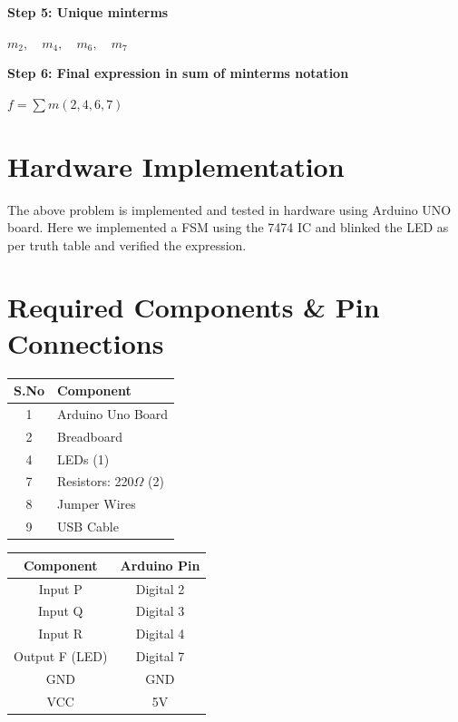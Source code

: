 \documentclass[a4paper,12pt]{article}
\begin{document}
\textbf{Step 5: Unique minterms}

$
m_2, \quad m_4, \quad m_6, \quad m_7
$

\textbf{Step 6: Final expression in sum of minterms notation}

$
f = \sum m(2, 4, 6, 7)
$

\section*{\textbf{Hardware Implementation}}
The above problem is implemented and tested in hardware using Arduino UNO board. Here we implemented a FSM using the 7474 IC and blinked the LED as per truth table and verified the expression.
\section*{Required Components \& Pin Connections}
\begin{center}
\begin{minipage}{0.45\textwidth}
\begin{table}[H]
\centering
\begin{tabular}{|c|l|}
\hline
\textbf{S.No} & \textbf{Component} \\ \hline
1 & Arduino Uno Board \\
2 & Breadboard \\
4 & LEDs (1) \\
7 & Resistors: 220$\Omega$ (2) \\
8 & Jumper Wires \\
9 & USB Cable \\
\hline
\end{tabular}
\end{table}
\end{minipage}
\hspace{0.05\textwidth}
\begin{minipage}{0.45\textwidth}
\begin{table}[H]
\centering
\begin{tabular}{|c|c|}
\hline
\textbf{Component} & \textbf{Arduino Pin} \\ \hline
Input P  & Digital 2 \\
Input Q  & Digital 3 \\
Input R  & Digital 4 \\
Output F (LED) & Digital 7 \\
GND & GND \\
VCC & 5V \\
\hline
\end{tabular}
\end{table}
\end{minipage}
\end{center}
\end{document}
